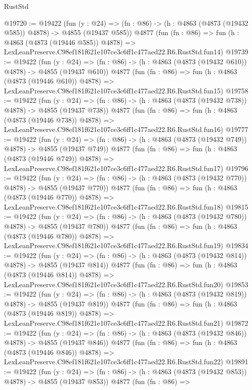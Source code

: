 \begin{lexlean}{RustStd}
\begin{coremodule}
@19720 := @19422
    (fun (y : @24) => (fn : @86) -> (h : @4863 (@4873 (@19432 @585)) @4878) -> @4855 (@19437 @585))
    @4877
    (fun (fn : @86) =>
    fun (h : @4863 (@4873 (@19446 @585)) @4878) =>
    LexLeanPreserve.C98ef181f621e107ce3c6ff1c477aed22.R6.RustStd.fun14)
@19739 := @19422
    (fun (y : @24) => (fn : @86) -> (h : @4863 (@4873 (@19432 @610)) @4878) -> @4855 (@19437 @610))
    @4877
    (fun (fn : @86) =>
    fun (h : @4863 (@4873 (@19446 @610)) @4878) =>
    LexLeanPreserve.C98ef181f621e107ce3c6ff1c477aed22.R6.RustStd.fun15)
@19758 := @19422
    (fun (y : @24) => (fn : @86) -> (h : @4863 (@4873 (@19432 @738)) @4878) -> @4855 (@19437 @738))
    @4877
    (fun (fn : @86) =>
    fun (h : @4863 (@4873 (@19446 @738)) @4878) =>
    LexLeanPreserve.C98ef181f621e107ce3c6ff1c477aed22.R6.RustStd.fun16)
@19777 := @19422
    (fun (y : @24) => (fn : @86) -> (h : @4863 (@4873 (@19432 @749)) @4878) -> @4855 (@19437 @749))
    @4877
    (fun (fn : @86) =>
    fun (h : @4863 (@4873 (@19446 @749)) @4878) =>
    LexLeanPreserve.C98ef181f621e107ce3c6ff1c477aed22.R6.RustStd.fun17)
@19796 := @19422
    (fun (y : @24) => (fn : @86) -> (h : @4863 (@4873 (@19432 @770)) @4878) -> @4855 (@19437 @770))
    @4877
    (fun (fn : @86) =>
    fun (h : @4863 (@4873 (@19446 @770)) @4878) =>
    LexLeanPreserve.C98ef181f621e107ce3c6ff1c477aed22.R6.RustStd.fun18)
@19815 := @19422
    (fun (y : @24) => (fn : @86) -> (h : @4863 (@4873 (@19432 @780)) @4878) -> @4855 (@19437 @780))
    @4877
    (fun (fn : @86) =>
    fun (h : @4863 (@4873 (@19446 @780)) @4878) =>
    LexLeanPreserve.C98ef181f621e107ce3c6ff1c477aed22.R6.RustStd.fun19)
@19834 := @19422
    (fun (y : @24) => (fn : @86) -> (h : @4863 (@4873 (@19432 @814)) @4878) -> @4855 (@19437 @814))
    @4877
    (fun (fn : @86) =>
    fun (h : @4863 (@4873 (@19446 @814)) @4878) =>
    LexLeanPreserve.C98ef181f621e107ce3c6ff1c477aed22.R6.RustStd.fun20)
@19853 := @19422
    (fun (y : @24) => (fn : @86) -> (h : @4863 (@4873 (@19432 @819)) @4878) -> @4855 (@19437 @819))
    @4877
    (fun (fn : @86) =>
    fun (h : @4863 (@4873 (@19446 @819)) @4878) =>
    LexLeanPreserve.C98ef181f621e107ce3c6ff1c477aed22.R6.RustStd.fun21)
@19872 := @19422
    (fun (y : @24) => (fn : @86) -> (h : @4863 (@4873 (@19432 @846)) @4878) -> @4855 (@19437 @846))
    @4877
    (fun (fn : @86) =>
    fun (h : @4863 (@4873 (@19446 @846)) @4878) =>
    LexLeanPreserve.C98ef181f621e107ce3c6ff1c477aed22.R6.RustStd.fun22)
@19891 := @19422
    (fun (y : @24) => (fn : @86) -> (h : @4863 (@4873 (@19432 @853)) @4878) -> @4855 (@19437 @853))
    @4877
    (fun (fn : @86) =>

\end{coremodule}
\end{lexlean}
